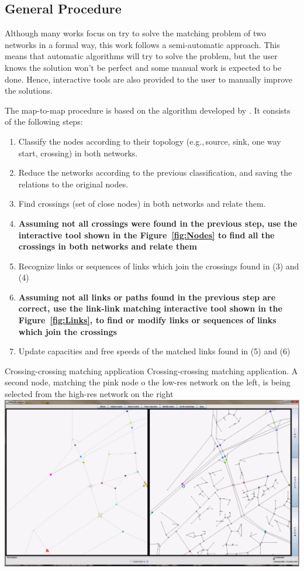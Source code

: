 \subsection{General Procedure}
Although many works focus on try to solve the matching problem of two networks in a formal way, this work follows a semi-automatic approach. This means that automatic algorithms will try to solve the problem, but the user knows the solution won't be perfect and some manual work is expected to be done. Hence, interactive tools are also provided to the user to manually improve the solutions.

The map-to-map procedure is based on the algorithm developed by \citet{BalmerEtAl_STRC_2005}. It consists of the following steps:

\begin{enumerate}
\item Classify the nodes according to their topology (e.g.,\,source, sink, one way start, crossing) in both networks.
\item Reduce the networks according to the previous classification, and saving the relations to the original nodes.
\item Find crossings (set of close nodes) in both networks and relate them.
\item \textbf{Assuming not all crossings were found in the previous step, use the interactive tool shown in the Figure~\ref{fig:Nodes} to find all the crossings in both networks and relate them}
\item Recognize links or sequences of links which join the crossings found in (3) and (4)
\item \textbf{Assuming not all links or paths found in the previous step are correct, use the link-link matching interactive tool shown in the Figure~\ref{fig:Links}, to find or modify links or sequences of links which join the crossings}
\item Update capacities and free speeds of the matched links found in (5) and (6)
\end{enumerate}

\createfigure
{Crossing-crossing matching application}
{Crossing-crossing matching application. A second node, matching the pink node o the low-res network on the left, is being selected from the high-res network on the right}
{\label{fig:Nodes}}
{\includegraphics[width=1.0\textwidth]{extending/figures/netEdSing/Nodes.png}}
{}

